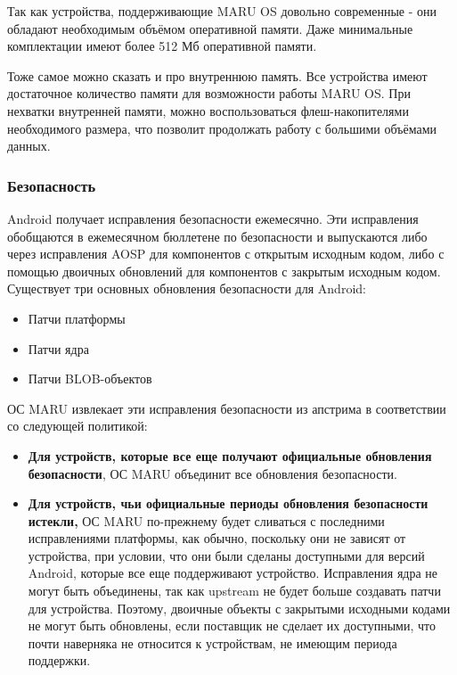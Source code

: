 \documentclass[a4paper, 14pt]{article}
\begin{document}
\par Так как устройства, поддерживающие MARU OS довольно современные - они обладают необходимым объёмом оперативной памяти. Даже минимальные комплектации имеют более 512 Мб оперативной памяти.
\par Тоже самое можно сказать и про внутреннюю память. Все устройства имеют достаточное количество памяти для возможности работы MARU OS. При нехватки внутренней памяти, можно воспользоваться флеш-накопителями необходимого размера, что позволит продолжать работу с большими объёмами данных.


\subsubsection{Безопасность}

\par Android получает исправления безопасности ежемесячно. Эти исправления обобщаются в ежемесячном бюллетене по безопасности и выпускаются либо через исправления AOSP для компонентов с открытым исходным кодом, либо с помощью двоичных обновлений для компонентов с закрытым исходным кодом. Существует три основных обновления безопасности для Android:

\begin{itemize}
    \item Патчи платформы
    \item Патчи ядра
    \item Патчи BLOB-объектов
\end{itemize}

\par ОС MARU извлекает эти исправления безопасности из апстрима в соответствии со следующей политикой:

\begin{itemize}
    \item \textbf{Для устройств, которые все еще получают официальные обновления безопасности}, ОС MARU объединит все обновления безопасности.
    \item \par \textbf{Для устройств, чьи официальные периоды обновления безопасности истекли,} ОС MARU по-прежнему будет сливаться с последними исправлениями платформы, как обычно, поскольку они не зависят от устройства, при условии, что они были сделаны доступными для версий Android, которые все еще поддерживают устройство. Исправления ядра не могут быть объединены, так как upstream не будет больше создавать патчи для устройства. Поэтому, двоичные объекты с закрытыми исходными кодами не могут быть обновлены, если поставщик не сделает их доступными, что почти наверняка не относится к устройствам, не имеющим периода поддержки.
\end{itemize}
\end{document}
